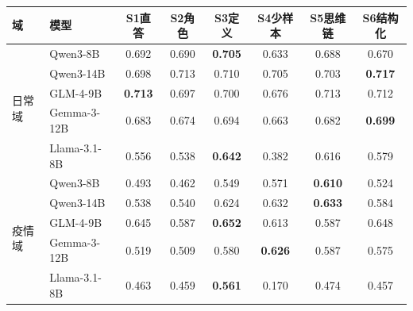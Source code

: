 \begin{tabular}{llcccccc}
\toprule
域 & 模型 & S1直答 & S2角色 & S3定义 & S4少样本 & S5思维链 & S6结构化 \\
\midrule
\multirow{5}{*}{日常域} & Qwen3-8B & 0.692 & 0.690 & \textbf{0.705} & 0.633 & 0.688 & 0.670 \\
& Qwen3-14B & 0.698 & 0.713 & 0.710 & 0.705 & 0.703 & \textbf{0.717} \\
& GLM-4-9B & \textbf{0.713} & 0.697 & 0.700 & 0.676 & 0.713 & 0.712 \\
& Gemma-3-12B & 0.683 & 0.674 & 0.694 & 0.663 & 0.682 & \textbf{0.699} \\
& Llama-3.1-8B & 0.556 & 0.538 & \textbf{0.642} & 0.382 & 0.616 & 0.579 \\
\midrule
\multirow{5}{*}{疫情域} & Qwen3-8B & 0.493 & 0.462 & 0.549 & 0.571 & \textbf{0.610} & 0.524 \\
& Qwen3-14B & 0.538 & 0.540 & 0.624 & 0.632 & \textbf{0.633} & 0.584 \\
& GLM-4-9B & 0.645 & 0.587 & \textbf{0.652} & 0.613 & 0.587 & 0.648 \\
& Gemma-3-12B & 0.519 & 0.509 & 0.580 & \textbf{0.626} & 0.587 & 0.575 \\
& Llama-3.1-8B & 0.463 & 0.459 & \textbf{0.561} & 0.170 & 0.474 & 0.457 \\
\bottomrule
\end{tabular}